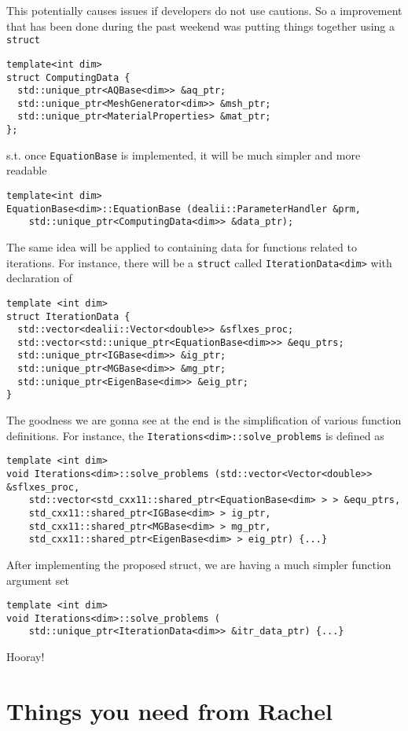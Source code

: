 \documentclass{article}
\begin{document}
This potentially causes issues if developers do not use cautions. So a improvement that
has been done during the past weekend was putting things together using a {\tt struct}
\begin{verbatim}
template<int dim>
struct ComputingData {
  std::unique_ptr<AQBase<dim>> &aq_ptr;
  std::unique_ptr<MeshGenerator<dim>> &msh_ptr;
  std::unique_ptr<MaterialProperties> &mat_ptr;
};
\end{verbatim}
s.t. once {\tt EquationBase} is implemented, it will be much simpler and more readable
\begin{verbatim}
template<int dim>
EquationBase<dim>::EquationBase (dealii::ParameterHandler &prm, 
    std::unique_ptr<ComputingData<dim>> &data_ptr);
\end{verbatim}

The same idea will be applied to containing data for functions related to iterations. 
For instance, there will be a {\tt struct} called {\tt IterationData<dim>} with declaration of
\begin{verbatim}
template <int dim>
struct IterationData {
  std::vector<dealii::Vector<double>> &sflxes_proc;
  std::vector<std::unique_ptr<EquationBase<dim>>> &equ_ptrs;
  std::unique_ptr<IGBase<dim>> &ig_ptr;
  std::unique_ptr<MGBase<dim>> &mg_ptr;
  std::unique_ptr<EigenBase<dim>> &eig_ptr;
}
\end{verbatim}
The goodness we are gonna see at the end is the simplification of various function definitions.
For instance, the {\tt Iterations<dim>::solve\_problems} is defined as
\begin{verbatim}
template <int dim>
void Iterations<dim>::solve_problems (std::vector<Vector<double>> &sflxes_proc,
    std::vector<std_cxx11::shared_ptr<EquationBase<dim> > > &equ_ptrs,
    std_cxx11::shared_ptr<IGBase<dim> > ig_ptr,
    std_cxx11::shared_ptr<MGBase<dim> > mg_ptr,
    std_cxx11::shared_ptr<EigenBase<dim> > eig_ptr) {...}
\end{verbatim}
After implementing the proposed struct, we are having a much simpler function argument
set
\begin{verbatim}
template <int dim>
void Iterations<dim>::solve_problems (
    std::unique_ptr<IterationData<dim>> &itr_data_ptr) {...}
\end{verbatim}
Hooray!
\section{Things you need from Rachel}
\end{document}
